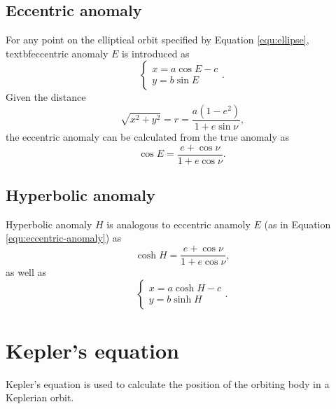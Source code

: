 \documentclass{article}
\begin{document}
\subsection{Eccentric anomaly}
For any point on the elliptical orbit specified by Equation \ref{equ:ellipse},
textbf{eccentric anomaly} $E$ is introduced as
\begin{equation}
  \begin{cases}
    x = a\cos E - c \\
    y = b\sin E
  \end{cases}\text{.}
\end{equation}
Given the distance
\begin{equation}
  \sqrt{x^2+y^2} = r = \frac{a(1 - e^2)}{1 + e \sin \nu}\text{,}
\end{equation}
the eccentric anomaly can be calculated from the true anomaly as
\begin{equation}
  \cos E = \frac{e + \cos \nu}{1 + e \cos\nu}\text{.}
  \label{equ:eccentric-anomaly}
\end{equation}

\subsection{Hyperbolic anomaly}
Hyperbolic anomaly $H$ is analogous to eccentric anamoly $E$
(as in Equation \ref{equ:eccentric-anomaly}) as
\begin{equation}
  \cosh H = \frac{e + \cos \nu}{1 + e\cos \nu}\text{,}
\end{equation}
as well as
\begin{equation}
  \begin{cases}
    x = a \cosh H - c \\
    y = b \sinh H
  \end{cases}\text{.}
\end{equation}


\section{Kepler's equation}
Kepler's equation is used to calculate the position of the orbiting
body in a Keplerian orbit.
\end{document}
